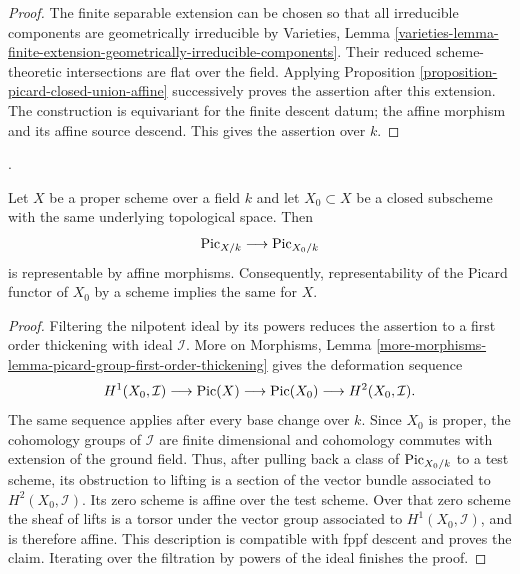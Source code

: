 \begin{proof}
The finite separable extension can be chosen so that all irreducible
components are geometrically irreducible by Varieties, Lemma
\ref{varieties-lemma-finite-extension-geometrically-irreducible-components}.
Their reduced scheme-theoretic intersections are flat over the field.
Applying Proposition \ref{proposition-picard-closed-union-affine}
successively proves the assertion after this extension. The construction is
equivariant for the finite descent datum; the affine morphism and its affine
source descend. This gives the assertion over $k$.
\end{proof}

\begin{proposition}
\label{proposition-picard-nilpotent-thickening-affine}
\begin{reference}
\cite[Expos\'e 232, Proposition 6.5, p. 159]{FGA}.
\end{reference}
Let $X$ be a proper scheme over a field $k$ and let $X_0 \subset X$ be a
closed subscheme with the same underlying topological space. Then
\begin{equation}
\label{equation-picard-nilpotent-thickening}
\mathrm{Pic}_{X/k} \longrightarrow \mathrm{Pic}_{X_0/k}
\end{equation}
is representable by affine morphisms. Consequently, representability of
the Picard functor of $X_0$ by a scheme implies the same for $X$.
\end{proposition}

\begin{proof}
Filtering the nilpotent ideal by its powers reduces the assertion to a first
order thickening with ideal $\mathcal{I}$. More on Morphisms, Lemma
\ref{more-morphisms-lemma-picard-group-first-order-thickening} gives the
deformation sequence
$$
H^1(X_0, \mathcal{I}) \longrightarrow \mathop{\mathrm{Pic}}\nolimits(X) \longrightarrow
\mathop{\mathrm{Pic}}\nolimits(X_0) \longrightarrow H^2(X_0, \mathcal{I}).
$$
The same sequence applies after every base change over $k$. Since $X_0$ is
proper, the cohomology groups of $\mathcal{I}$ are finite dimensional and
cohomology commutes with extension of the ground field. Thus, after pulling
back a class of $\mathrm{Pic}_{X_0/k}$ to a test scheme, its obstruction to
lifting is a section of the vector bundle associated to
$H^2(X_0, \mathcal{I})$. Its zero scheme is affine over the test scheme.
Over that zero scheme the sheaf of lifts is a torsor under the vector group
associated to $H^1(X_0, \mathcal{I})$, and is therefore affine. This
description is compatible with fppf descent and proves the claim. Iterating
over the filtration by powers of the ideal finishes the proof.
\end{proof}


